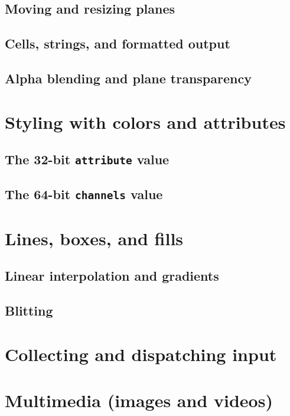 \documentclass[letterpaper,10pt]{article}
\begin{document}
\subsection{Moving and resizing planes}
\subsection{Cells, strings, and formatted output}
\subsection{Alpha blending and plane transparency}

\section{Styling with colors and attributes}
\subsection{The 32-bit \texttt{attribute} value}
\subsection{The 64-bit \texttt{channels} value}

\section{Lines, boxes, and fills}
\subsection{Linear interpolation and gradients}
\subsection{Blitting}

\section{Collecting and dispatching input}

\section{Multimedia (images and videos)}
\end{document}
